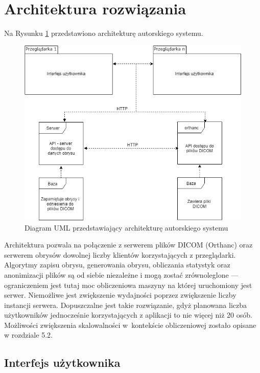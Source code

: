 \documentclass[a4paper,11pt,twoside,openright]{report}
\theoremstyle{definition}
\begin{document}
\section {Architektura rozwiązania}

Na Rysunku \ref{fig:architektura} przedstawiono architekturę autorskiego systemu.

\begin{figure}[h]
	\center
	\includegraphics[width=1\textwidth]{architektura}
	\caption{Diagram UML przedstawiający architekturę autorskiego systemu}
    	\label{fig:architektura}
\end{figure}

Architektura pozwala na połączenie z serwerem plików DICOM (Orthanc) oraz serwerem
obrysów dowolnej liczby klientów korzystających z przeglądarki. Algorytmy zapisu
obrysu, generowania obrysu, obliczania statystyk oraz anonimizacji plików są od
siebie niezależne i mogą zostać zrównoleglone --- ograniczeniem jest tutaj moc
obliczeniowa maszyny na której uruchomiony jest serwer. Niemożliwe jest zwiększenie
wydajności poprzez zwiększenie liczby instancji serwera. Dopuszczalne jest takie
rozwiązanie, gdyż planowana liczba użytkowników jednocześnie korzystających z aplikacji
to nie więcej niż 20 osób. Możliwości zwiększenia skalowalności w~kontekście
obliczeniowej zostało opisane w rozdziale 5.2.

\subsection {Interfejs użytkownika}
\end{document}
